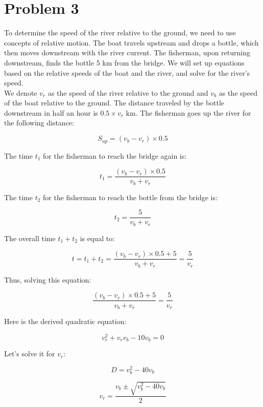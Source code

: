\section{Problem 3}

\vspace{7mm}

To determine the speed of the river relative to the ground, we need to use concepts of relative motion. The boat travels upstream and drops a bottle, which then moves downstream with the river current. The fisherman, upon returning downstream, finds the bottle 5 km from the bridge. We will set up equations based on the relative speeds of the boat and the river, and solve for the river's speed. \\

We denote \( v_r \) as the speed of the river relative to the ground and \( v_b \) as the speed of the boat relative to the ground. The distance traveled by the bottle downstream in half an hour is \( 0.5 \times v_r \) km. The fisherman goes up the river for the following distance:

\[
S_{up} = (v_b - v_r) \times 0.5
\]

The time \( t_1 \) for the fisherman to reach the bridge again is:

\[
t_1 = \frac{(v_b - v_r) \times 0.5}{v_b + v_r}
\]

The time \( t_2 \) for the fisherman to reach the bottle from the bridge is:

\[
t_2 = \frac{5}{v_b + v_r}
\]

The overall time \( t_1 + t_2 \) is equal to:

\[
t = t_1 + t_2 = \frac{(v_b - v_r) \times 0.5 + 5}{v_b + v_r} = \frac{5}{v_r}
\]

Thus, solving this equation:

\[
\frac{(v_b - v_r) \times 0.5 + 5}{v_b + v_r} = \frac{5}{v_r}
\]

Here is the derived quadratic equation:

\[
v_r^2 + v_r v_b - 10 v_b = 0
\]

Let's solve it for \( v_r \):

\[
D = v_b^2 - 40 v_b
\]

\[
v_r = \frac{v_b \pm \sqrt{v_b^2 - 40 v_b}}{2}
\]

